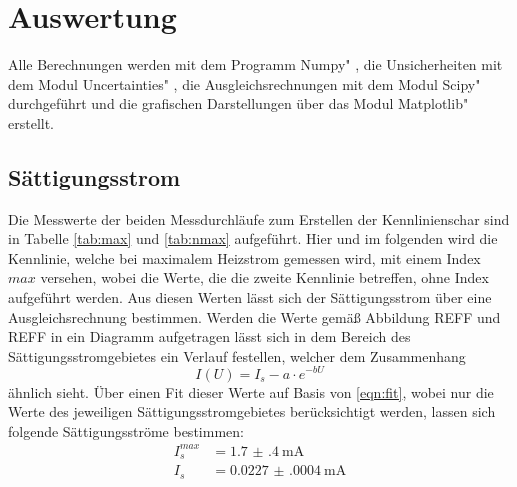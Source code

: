 \section{Auswertung}
\label{sec:Auswertung}
Alle Berechnungen werden mit dem Programm \glqq Numpy" \cite{numpy}, die Unsicherheiten mit dem Modul \glqq Uncertainties" \cite{uncertainties}, die Ausgleichsrechnungen mit dem Modul \glqq Scipy" \cite{scipy} durchgeführt und die grafischen Darstellungen über das Modul \glqq Matplotlib" \cite{matplotlib} erstellt.


\subsection{Sättigungsstrom}
\label{sub:Sättigungsstrom}

Die Messwerte der beiden Messdurchläufe zum Erstellen der Kennlinienschar sind in Tabelle \ref{tab:max} und \ref{tab:nmax} aufgeführt. Hier und im folgenden wird die Kennlinie, welche bei maximalem Heizstrom gemessen wird, mit einem Index $max$ versehen, wobei die Werte, die die zweite Kennlinie betreffen, ohne Index aufgeführt werden. Aus diesen Werten lässt sich der Sättigungsstrom über eine Ausgleichsrechnung bestimmen. Werden die Werte gemäß Abbildung REFF und REFF in ein Diagramm aufgetragen lässt sich in dem Bereich des Sättigungsstromgebietes ein Verlauf festellen, welcher dem Zusammenhang
\begin{equation}
    I(U)=I_s-a\cdot e^{-bU}
    \label{eqn:fit}
\end{equation}
ähnlich sieht. Über einen Fit dieser Werte auf Basis von \ref{eqn:fit}, wobei nur die Werte des jeweiligen Sättigungsstromgebietes berücksichtigt werden, lassen sich folgende Sättigungsströme bestimmen:
\begin{align*}
I_s^{max}& = \SI{1.7(4)}{\milli\A}  \\
I_s& = \SI{0.0227(0004)}{\milli\A}
\end{align*}


